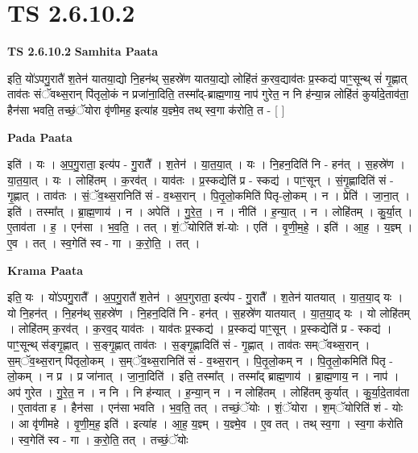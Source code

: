 \documentclass[17pt]{extarticle}
\begin{document}
\section*{ TS 2.6.10.2 }

\textbf{TS 2.6.10.2 } \newline
\textbf{Samhita Paata} \newline

इति॒ यो॑ऽपगु॒रातै॑ श॒तेन॑ यातया॒द्यो नि॒हन॑थ् स॒हस्रे॑ण यातया॒द्यो लोहि॑तं क॒रव॒द्याव॑तः प्र॒स्कद्य॑ पाꣳ॒॒सून्थ् सं॑ गृ॒ह्णात् ताव॑तः संॅवथ्स॒रान् पि॑तृलो॒कं न प्रजा॑ना॒दिति॒ तस्मा᳚द्-ब्राह्म॒णाय॒ नाप॑ गुरेत॒ न नि ह॑न्या॒न्न लोहि॑तं कुर्यादे॒ताव॑ता॒ हैन॑सा भवति॒ तच्छं॒ॅयोरा वृ॑णीमह॒ इत्या॑ह य॒ज्ञ्मे॒व तथ् स्व॒गा क॑रोति॒ त - [  ] \newline

\textbf{Pada Paata} \newline

इति॑ । यः । अ॒प॒गु॒राता॒ इत्य॑प - गु॒रातै᳚ । श॒तेन॑ । या॒त॒या॒त् । यः । नि॒हन॒दिति॑ नि - हन॑त् । स॒हस्रे॑ण । या॒त॒या॒त् । यः । लोहि॑तम् । क॒रव॑त् । याव॑तः । प्र॒स्कद्येति॑ प्र - स्कद्य॑ । पाꣳ॒॒सून् । सं॒गृ॒ह्णादिति॑ सं - गृ॒ह्णात् । ताव॑तः । सं॒ॅव॒थ्स॒रानिति॑ सं - व॒थ्स॒रान् । पि॒तृ॒लो॒कमिति॑ पितृ-लो॒कम् । न । प्रेति॑ । जा॒ना॒त् । इति॑ । तस्मा᳚त् । ब्रा॒ह्म॒णाय॑ । न । अपेति॑ । गु॒रे॒त॒ । न । नीति॑ । ह॒न्या॒त् । न । लोहि॑तम् । कु॒र्या॒त् । ए॒ताव॑ता । ह॒ । एन॑सा । भ॒व॒ति॒ । तत् । शं॒ॅयोरिति॑ शं-योः । एति॑ । वृ॒णी॒म॒हे॒ । इति॑ । आ॒ह॒ । य॒ज्ञ्म् । ए॒व । तत् । स्व॒गेति॑ स्व - गा । क॒रो॒ति॒ । तत् ।  \newline


\textbf{Krama Paata} \newline

इति॒ यः । यो॑ऽपगु॒रातै᳚ । अ॒प॒गु॒रातै॑ श॒तेन॑ । अ॒प॒गुराता॒ इत्य॑प - गु॒रातै᳚ । श॒तेन॑ यातयात् । या॒त॒या॒द् यः । यो नि॒हन॑त् । नि॒हन॑थ् स॒हस्रे॑ण । नि॒हन॒दिति॑ नि - हन॑त् । स॒हस्रे॑ण यातयात् । या॒त॒या॒द् यः । यो लोहि॑तम् । लोहि॑तम् क॒रव॑त् । क॒रव॒द् याव॑तः । याव॑तः प्र॒स्कद्य॑ । प्र॒स्कद्य॑ पाꣳ॒॒सून् । प्र॒स्कद्येति॑ प्र - स्कद्य॑ । पाꣳ॒॒सून्थ् स॑ङ्गृ॒ह्णात् । स॒ङ्गृ॒ह्णात् ताव॑तः । स॒ङ्गृ॒ह्णादिति॑ सं - गृ॒ह्णात् । ताव॑तः सम्ॅवथ्स॒रान् । स॒म्ॅव॒थ्स॒रान् पि॑तृलो॒कम् । स॒म्ॅव॒थ्स॒रानिति॑ सं - व॒थ्स॒रान् । पि॒तृ॒लो॒कम् न । पि॒तृ॒लो॒कमिति॑ पितृ - लो॒कम् । न प्र । प्र जा॑नात् । जा॒ना॒दिति॑ । इति॒ तस्मा᳚त् । तस्मा᳚द् ब्राह्म॒णाय॑ । ब्रा॒ह्म॒णाय॒ न । नाप॑ । अप॑ गुरेत । गु॒रे॒त॒ न । न नि । नि ह॑न्यात् । ह॒न्या॒न् न । न लोहि॑तम् । लोहि॑तम् कुर्यात् । कु॒र्या॒दे॒ताव॑ता । ए॒ताव॑ता ह । हैन॑सा । एन॑सा भवति । भ॒व॒ति॒ तत् । 
तच्छं॒ॅयोः । शं॒ॅयोरा । श॒म्ॅयोरिति॑ शं - योः । आ वृ॑णीमहे । वृ॒णी॒म॒ह॒ इति॑ । इत्या॑ह । आ॒ह॒ य॒ज्ञ्म् । य॒ज्ञ्मे॒व । ए॒व तत् । तथ् स्व॒गा । स्व॒गा क॑रोति । स्व॒गेति॑ स्व - गा । क॒रो॒ति॒ तत् । तच्छं॒ॅयोः \newline
\end{document}
